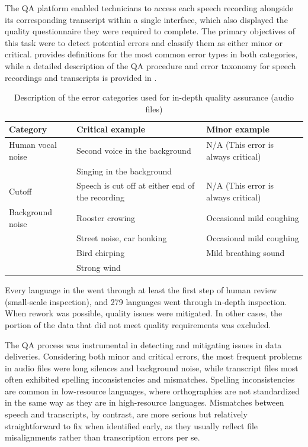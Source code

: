\documentclass[]{fairmeta}
\begin{document}
The QA platform enabled technicians to access each speech recording alongside its corresponding transcript within a single interface, which also displayed the quality questionnaire they were required to complete. The primary objectives of this task were to detect potential errors and classify them as either minor or critical.  provides definitions for the most common error types in both categories, while a detailed description of the QA procedure and error taxonomy for speech recordings and transcripts is provided in .
\begin{table}[!ht]
    \centering
    \begin{tabular}{p{3cm}p{6cm}p{6cm}}
    \toprule
     \textbf{\small{Category}}  & \textbf{\small{Critical example}} & \textbf{\small{Minor example}} \\
     \midrule
     \small{Human vocal noise} & \small{Second voice in the background} & \small{N/A (This error is always critical)} \\
     & \small{Singing in the background} &  \\
    \midrule
    \small{Cutoff} & \small{Speech is cut off at either end of the recording} &  \small{N/A (This error is always critical)}\\
     \midrule
     \small{Background noise} & \small{Rooster crowing} & \small{Occasional mild coughing} \\
     & \small{Street noise, car honking} & \small{Occasional mild coughing} \\
     & \small{Bird chirping} & \small{Mild breathing sound}\\
     & \small{Strong wind} & \\
     \bottomrule
    \end{tabular}
    \caption{Description of the error categories used for in-depth quality assurance (audio files)}
    \label{tab:qa_errors}
\end{table}

Every language in the \vendorcorpus went through at least the first step of human review (small-scale inspection), and 279 languages went through in-depth inspection. When rework was possible, quality issues were mitigated. In other cases, the portion of the data that did not meet quality requirements was excluded.  

The QA process was instrumental in detecting and mitigating issues in data deliveries. Considering both minor and critical errors, the most frequent problems in audio files were long silences and background noise, while transcript files most often exhibited spelling inconsistencies and mismatches. Spelling inconsistencies are common in low-resource languages, where orthographies are not standardized in the same way as they are in high-resource languages. Mismatches between speech and transcripts, by contrast, are more serious but relatively straightforward to fix when identified early, as they usually reflect file misalignments rather than transcription errors per se.
\end{document}
